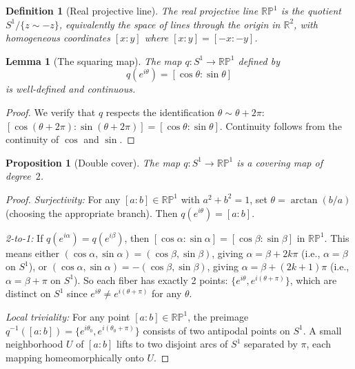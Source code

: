 \documentclass[11pt,letterpaper]{article}
\newtheorem{lemma}[theorem]{Lemma}
\newtheorem{proposition}[theorem]{Proposition}
\newtheorem{definition}[theorem]{Definition}
\begin{document}
\begin{definition}[Real projective line]\label{def:RP1}
The real projective line $\mathbb{RP}^1$ is the quotient $S^1 / \{z \sim -z\}$, equivalently the space of lines through the origin in $\mathbb{R}^2$, with homogeneous coordinates $[x : y]$ where $[x:y] = [-x:-y]$.
\end{definition}

\begin{lemma}[The squaring map]\label{lem:hopf}
The map $q: S^1 \to \mathbb{RP}^1$ defined by
\begin{equation}
q(e^{i\theta}) = [\cos\theta : \sin\theta]
\end{equation}
is well-defined and continuous.
\end{lemma}

\begin{proof}
We verify that $q$ respects the identification $\theta \sim \theta + 2\pi$: $[\cos(\theta + 2\pi) : \sin(\theta + 2\pi)] = [\cos\theta : \sin\theta]$. Continuity follows from the continuity of $\cos$ and $\sin$.
\end{proof}

\begin{proposition}[Double cover]\label{prop:cover}
The map $q: S^1 \to \mathbb{RP}^1$ is a covering map of degree~$2$.
\end{proposition}

\begin{proof}
\emph{Surjectivity:} For any $[a : b] \in \mathbb{RP}^1$ with $a^2 + b^2 = 1$, set $\theta = \arctan(b/a)$ (choosing the appropriate branch). Then $q(e^{i\theta}) = [a:b]$.

\emph{2-to-1:} If $q(e^{i\alpha}) = q(e^{i\beta})$, then $[\cos\alpha : \sin\alpha] = [\cos\beta : \sin\beta]$ in $\mathbb{RP}^1$. This means either $(\cos\alpha, \sin\alpha) = (\cos\beta, \sin\beta)$, giving $\alpha = \beta + 2k\pi$ (i.e., $\alpha = \beta$ on $S^1$), or $(\cos\alpha, \sin\alpha) = -(\cos\beta, \sin\beta)$, giving $\alpha = \beta + (2k+1)\pi$ (i.e., $\alpha = \beta + \pi$ on $S^1$). So each fiber has exactly 2 points: $\{e^{i\theta}, e^{i(\theta + \pi)}\}$, which are distinct on $S^1$ since $e^{i\theta} \neq e^{i(\theta+\pi)}$ for any $\theta$.

\emph{Local triviality:} For any point $[a:b] \in \mathbb{RP}^1$, the preimage $q^{-1}([a:b]) = \{e^{i\theta_0}, e^{i(\theta_0 + \pi)}\}$ consists of two antipodal points on $S^1$. A small neighborhood $U$ of $[a:b]$ lifts to two disjoint arcs of $S^1$ separated by $\pi$, each mapping homeomorphically onto $U$.
\end{proof}
\end{document}
